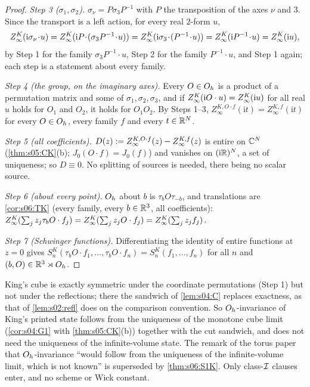 \begin{proof}
\emph{Step 3 ($\sigma_1,\sigma_2$).} $\sigma_\nu=P\sigma_3P^{-1}$ with $P$ the transposition of the axes $\nu$ and $3$. Since the transport is a left action, for every real $2$-form $u$,
\[
\ZKinf(\mathrm i\sigma_\nu\!\cdot\!u)=\ZKinf(\mathrm iP\!\cdot\!(\sigma_3P^{-1}\!\cdot\!u))=\ZKinf(\mathrm i\sigma_3\!\cdot\!(P^{-1}\!\cdot\!u))=\ZKinf(\mathrm iP^{-1}\!\cdot\!u)=\ZKinf(\mathrm iu),
\]
by Step 1 for the family $\sigma_3P^{-1}\cdot u$, Step 2 for the family $P^{-1}\cdot u$, and Step 1 again; each step is a statement about every family.

\emph{Step 4 (the group, on the imaginary axes).} Every $O\in O_h$ is a product of a permutation matrix and some of $\sigma_1,\sigma_2,\sigma_3$, and if $Z^{K}_{\infty}(\mathrm iO\cdot u)=Z^{K}_{\infty}(\mathrm iu)$ for all real $u$ holds for $O_1$ and $O_2$, it holds for $O_1O_2$. By Steps 1--3, $Z^{K,O\cdot f}_\infty(\mathrm it)=Z^{K,f}_\infty(\mathrm it)$ for every $O\in O_h$, every family $f$ and every $t\in\mathbb R^N$.

\emph{Step 5 (all coefficients).} $D(z):= Z^{K,O\cdot f}_\infty(z)-Z^{K,f}_\infty(z)$ is entire on $\mathbb C^N$ (\cref{thm:s05:CK}(b); $J_0(O\cdot f)=J_0(f)$) and vanishes on $(\mathrm i\mathbb R)^N$, a set of uniqueness; so $D\equiv0$. No splitting of sources is needed, there being no scalar source.

\emph{Step 6 (about every point).} $O_h$ about $b$ is $\tau_bO\tau_{-b}$, and translations are \cref{cor:s06:TK} (every family, every $b\in\mathbb R^3$, all coefficients): $Z^{K}_{\infty}(\sum_jz_j\tau_bO\cdot f_j)=Z^{K}_{\infty}(\sum_jz_jO\cdot f_j)=Z^{K}_{\infty}(\sum_jz_jf_j)$.

\emph{Step 7 (Schwinger functions).} Differentiating the identity of entire functions at $z=0$ gives $S^K_n(\tau_bO\cdot f_1,\dots,\tau_bO\cdot f_n)=S^K_n(f_1,\dots,f_n)$ for all $n$ and $(b,O)\in\mathbb R^3\rtimes O_h$.
\end{proof}

\begin{remark}\label{rem:s06:K4}
King's cube is exactly symmetric under the coordinate permutations (Step 1) but not under the reflections; there the sandwich of \cref{lem:s04:C} replaces exactness, as that of \cref{lem:s02:refl} does on the comparison convention. So $O_h$-invariance of King's printed state follows from the uniqueness of the monotone cube limit (\cref{cor:s04:G1} with \cref{thm:s05:CK}(b)) together with the cut sandwich, and does not need the uniqueness of the infinite-volume state. The remark of the torus paper \cite{SymPhase} that $O_h$-invariance ``would follow from the uniqueness of the infinite-volume limit, which is not known'' is superseded by \cref{thm:s06:S1K}. Only class-$\mathcal I$ clauses enter, and no scheme or Wick constant.
\end{remark}

